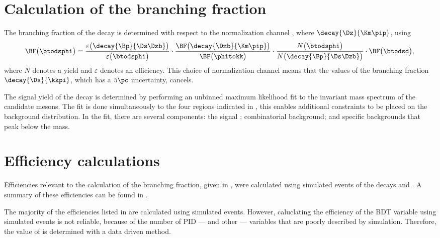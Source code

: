 \section{Calculation of the branching fraction}
\label{sec:dsphi:bf}
The branching fraction of the decay \btodsphi is determined with respect to the normalization
channel \btodsd, where $\decay{\Dz}{\Km\pip}$, using
\begin{equation}
  \BF\big(\btodsphi\big) =
  \frac{\varepsilon\big(\decay{\Bp}{\Ds\Dzb}\big)}{\varepsilon\big(\btodsphi\big)}
  \cdot
  \frac{\BF\big(\decay{\Dzb}{\Km\pip}\big)}{\BF\big(\phitokk\big)}
  \cdot
  \frac{N\big(\btodsphi\big)}{N\big(\decay{\Bp}{\Ds\Dzb}\big)}
  \cdot
  \BF\big(\btodsd\big)
  , \\
  \label{eq:dsphi:bf}
\end{equation}
where $N$ denotes a yield and $\varepsilon$ denotes an efficiency.
This choice of normalization channel means that the values of the branching fraction
$\decay{\Ds}{\kkpi}$, which has a $5\pc$ uncertainty, cancels.

The signal yield of the decay \btodsphi is determined by performing an unbinned maximum likelihood
fit to the invariant mass spectrum of the candidate \Bp mesons.
The fit is done simultaneously to the four regions indicated in , this enables
additional constraints to be placed on the background distribution.
In the fit, there are several components: the signal \btodsphi; combinatorial background; and
specific backgrounds that peak below the \Bp mass.


\section{Efficiency calculations}
Efficiencies relevant to the calculation of the
branching fraction, given in , were
calculated using simulated events of the decays \btodsphi and \btodsd.
A summary of these efficiencies can be found in .

The majority of the efficiencies listed in  are calculated using simulated
\btodsphi events.
However, caluclating the efficiency of the BDT variable using simulated events is not reliable,
because of the number of PID --- and other --- variables that are poorly described by simulation.
Therefore, the value of  is determined with a data driven method.

